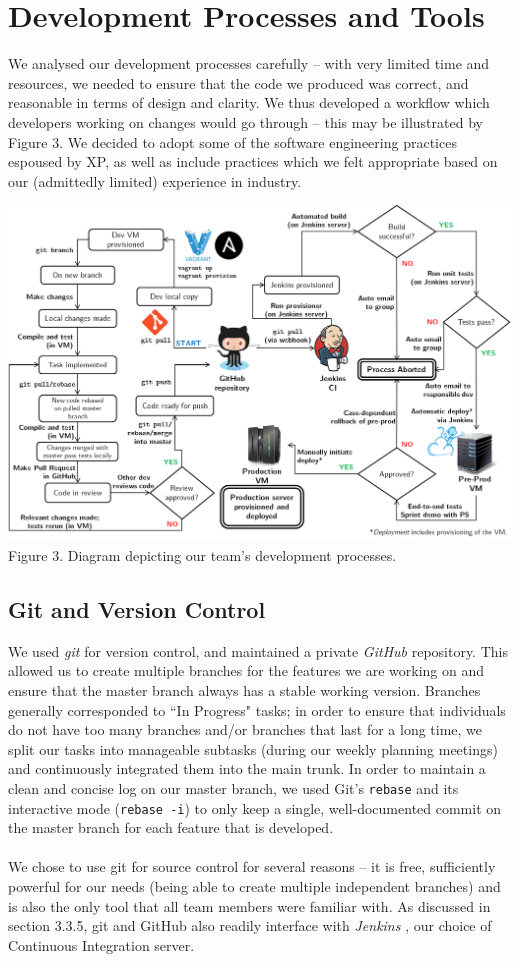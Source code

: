 \documentclass[a4paper, 10pt]{report}
\begin{document}
\section{Development Processes and Tools}
We analysed our development processes carefully -- with very limited time and resources, we needed to ensure that the code we produced was correct, and reasonable in terms of design and clarity. We thus developed a workflow which developers working on changes would go through -- this may be illustrated by Figure 3. We decided to adopt some of the software engineering practices espoused by XP, as well as include practices which we felt appropriate based on our (admittedly limited) experience in industry.
\begin{center}
\includegraphics[scale=0.6]{workflow_diagram.png}
Figure 3. Diagram depicting our team's development processes.
\end{center}
\subsection{Git and Version Control}
We used \textit{git} \cite{git} for version control, and maintained a private \textit{GitHub} \cite{github} repository. This allowed us to create multiple branches for the features we are working on and ensure that the master branch always has a stable working version. Branches generally corresponded to ``In Progress" tasks; in order to ensure that individuals do not have too many branches and/or branches that last for a long time, we split our tasks into manageable subtasks (during our weekly planning meetings) and continuously integrated them into the main trunk. In order to maintain a clean and concise log on our master branch, we used Git's \texttt{rebase} and its interactive mode (\texttt{rebase -i}) to only keep a single, well-documented commit on the master branch for each feature that is developed.\\\\
We chose to use git for source control for several reasons -- it is free, sufficiently powerful for our needs (being able to create multiple independent branches) and is also the only tool that all team members were familiar with. As discussed in section 3.3.5, git and GitHub also readily interface with \textit{Jenkins} \cite{jenkins}, our choice of Continuous Integration server.
\end{document}
